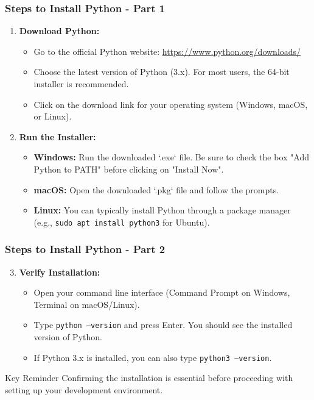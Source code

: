 \documentclass{beamer}
\begin{document}
\begin{frame}[fragile]
    \frametitle{Steps to Install Python - Part 1}
    \begin{enumerate}
        \item \textbf{Download Python:}
        \begin{itemize}
            \item Go to the official Python website: \url{https://www.python.org/downloads/}
            \item Choose the latest version of Python (3.x). For most users, the 64-bit installer is recommended.
            \item Click on the download link for your operating system (Windows, macOS, or Linux).
        \end{itemize}

        \item \textbf{Run the Installer:}
        \begin{itemize}
            \item \textbf{Windows:} Run the downloaded `.exe` file. Be sure to check the box "Add Python to PATH" before clicking on "Install Now".
            \item \textbf{macOS:} Open the downloaded `.pkg` file and follow the prompts.
            \item \textbf{Linux:} You can typically install Python through a package manager (e.g., \texttt{sudo apt install python3} for Ubuntu).
        \end{itemize}
    \end{enumerate}
\end{frame}

\begin{frame}[fragile]
    \frametitle{Steps to Install Python - Part 2}
    \begin{enumerate}
        \setcounter{enumi}{2} %
        \item \textbf{Verify Installation:}
        \begin{itemize}
            \item Open your command line interface (Command Prompt on Windows, Terminal on macOS/Linux).
            \item Type \texttt{python --version} and press Enter. You should see the installed version of Python.
            \item If Python 3.x is installed, you can also type \texttt{python3 --version}.
        \end{itemize}
    \end{enumerate}

    \begin{block}{Key Reminder}
        Confirming the installation is essential before proceeding with setting up your development environment.
    \end{block}
\end{frame}
\end{document}
